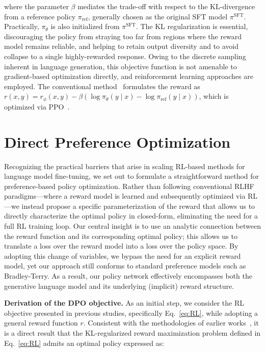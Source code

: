 where the parameter $\beta$ mediates the trade-off with respect to the KL-divergence from a reference policy $\pi_\text{ref}$, generally chosen as the original SFT model $\pi^\text{SFT}$. Practically, $\pi_\theta$ is also initialized from $\pi^\text{SFT}$. The KL regularization is essential, discouraging the policy from straying too far from regions where the reward model remains reliable, and helping to retain output diversity and to avoid collapse to a single highly-rewarded response. Owing to the discrete sampling inherent in language generation, this objective function is not amenable to gradient-based optimization directly, and reinforcement learning approaches are employed. The conventional method~\citep{ziegler2020finetuning, stiennon2022learning, bai2022training, ouyang2022training} formulates the reward as ${r(x, y) = r_{\phi}(x, y) -\beta (\log \pi_{\theta}(y\mid x) - \log \pi_\text{ref}(y\mid x))}$, which is optimized via PPO~\cite{schulman2017proximal}. 

\section{Direct Preference Optimization}\label{sec:DPO}

Recognizing the practical barriers that arise in scaling RL-based methods for language model fine-tuning, we set out to formulate a straightforward method for preference-based policy optimization. Rather than following conventional RLHF paradigms—where a reward model is learned and subsequently optimized via RL—we instead propose a specific parameterization of the reward that allows us to directly characterize the optimal policy in closed-form, eliminating the need for a full RL training loop. Our central insight is to use an analytic connection between the reward function and its corresponding optimal policy; this allows us to translate a loss over the reward model into a loss over the policy space. By adopting this change of variables, we bypass the need for an explicit reward model, yet our approach still conforms to standard preference models such as Bradley-Terry. As a result, our policy network effectively encompasses both the generative language model and its underlying (implicit) reward structure.

\textbf{Derivation of the DPO objective.} As an initial step, we consider the RL objective presented in previous studies, specifically Eq.~\ref{eq:RL}, while adopting a general reward function $r$. Consistent with the methodologies of earlier works~\citep{peters2007reinforcement, peng2019advantage, korbak2022reinforcement, go2023aligning}, it is a direct result that the KL-regularized reward maximization problem defined in Eq.~\ref{eq:RL} admits an optimal policy expressed as:

